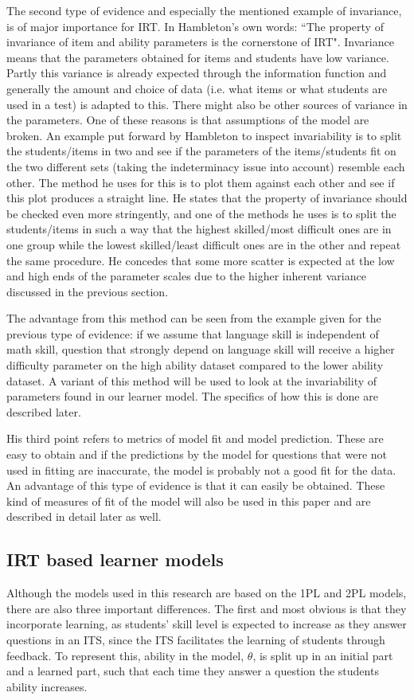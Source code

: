 \documentclass{scrartcl}
\begin{document}
The second type of evidence and especially the mentioned example of invariance, is of major importance for IRT. In Hambleton's own words: ``The property of invariance of item and ability parameters is the cornerstone of IRT". Invariance means that the parameters obtained for items and students have low variance. Partly this variance is already expected through the information function and generally the amount and choice of data (i.e. what items or what students are used in a test) is adapted to this. There might also be other sources of variance in the parameters. One of these reasons is that assumptions of the model are broken. An example put forward by Hambleton to inspect invariability is to split the students/items in two and see if the parameters of the items/students fit on the two different sets (taking the indeterminacy issue into account) resemble each other. The method he uses for this is to plot them against each other and see if this plot produces a straight line. He states that the property of invariance should be checked even more stringently, and one of the methods he uses is to split the students/items in such a way that the highest skilled/most difficult ones are in one group while the lowest skilled/least difficult ones are in the other and repeat the same procedure. He concedes that some more scatter is expected at the low and high ends of the parameter scales due to the higher inherent variance discussed in the previous section. 

The advantage from this method can be seen from the example given for the previous type of evidence: if we assume that language skill is independent of math skill, question that strongly depend on language skill will receive a higher difficulty parameter on the high ability dataset compared to the lower ability dataset. A variant of this method will be used to look at the invariability of parameters found in our learner model. The specifics of how this is done are described later. 

His third point refers to metrics of model fit and model prediction. These are easy to obtain and if the predictions by the model for questions that were not used in fitting are inaccurate, the model is probably not a good fit for the data. An advantage of this type of evidence is that it can easily be obtained. These kind of measures of fit of the model will also be used in this paper and are described in detail later as well. 

\subsection{IRT based learner models}
Although the models used in this research are based on the 1PL and 2PL models, there are also three important differences. The first and most obvious is that they incorporate learning, as students' skill level is expected to increase as they answer questions in an ITS, since the ITS facilitates the learning of students through feedback. To represent this, ability in the model, $\theta$, is split up in an initial part and a learned part, such that each time they answer a question the students ability increases.
\end{document}
